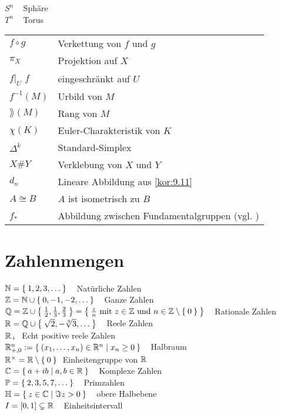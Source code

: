 $S^n\;\;\;$ Sphäre\\
$T^n\;\;\;$ Torus\\

\settowidth{}
\setlength\mylengthb{\dimexpr\columnwidth-\mylengtha-2\tabcolsep\relax}

\begin{xtabular}{@{} p{\mylengtha} P{\mylengthb} @{}}
$f \circ g$&Verkettung von $f$ und $g$\\
$\pi_X$    &Projektion auf $X$\\
$f|_U$ $f$ &eingeschränkt auf $U$\\
$f^{-1}(M)$&Urbild von $M$\\
$\rang(M)$ & Rang von $M$\\
$\chi(K)$  & Euler-Charakteristik von $K$\\
$\Delta^k$ & Standard-Simplex\\
$X \# Y$   & Verklebung von $X$ und $Y$\\
$d_n$      & Lineare Abbildung aus \cref{kor:9.11}\\
$A \cong B$& $A$ ist isometrisch zu $B$\\
$f_*$      & Abbildung zwischen Fundamentalgruppen (vgl. )
\end{xtabular}

\onecolumn

\section*{Zahlenmengen}
$\mathbb{N} = \Set{1, 2, 3, \dots} \;\;\;$ Natürliche Zahlen\\
$\mathbb{Z} = \mathbb{N} \cup \Set{0, -1, -2, \dots} \;\;\;$ Ganze Zahlen\\
$\mathbb{Q} = \mathbb{Z} \cup \Set{\frac{1}{2}, \frac{1}{3}, \frac{2}{3}} = \Set{\frac{z}{n} \text{ mit } z \in \ensuremath{\mathbb{Z}}\text{ und } n \in \ensuremath{\mathbb{Z}}\setminus \Set{0}} \;\;\;$ Rationale Zahlen\\
$\mathbb{R} = \mathbb{Q} \cup \Set{\sqrt{2}, -\sqrt[3]{3}, \dots}\;\;\;$ Reele Zahlen\\
$\mathbb{R}_+\;$ Echt positive reele Zahlen\\
$\mathbb{R}_{+,0}^n := \Set{(x_1, \dots, x_n) \in \ensuremath{\mathbb{R}}^n | x_n \geq 0}\;\;\;$ Halbraum\\
$\mathbb{R}^\times = \mathbb{R} \setminus \Set{0} \;$ Einheitengruppe von $\mathbb{R}$\\
$\mathbb{C} = \Set{a+ib|a,b \in \ensuremath{\mathbb{R}}}\;\;\;$ Komplexe Zahlen\\
$\mathbb{P} = \Set{2, 3, 5, 7, \dots}\;\;\;$ Primzahlen\\
$\mathbb{H} = \Set{z \in \ensuremath{\mathbb{C}}| \Im{z} > 0}\;\;\;$ obere Halbebene\\
$I = [0,1] \subsetneq \mathbb{R}\;\;\;$ Einheitsintervall\\

